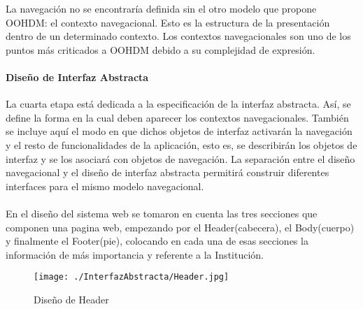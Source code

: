 {\large La navegación no se encontraría definida sin el otro modelo que propone OOHDM: el contexto navegacional. Esto es la estructura de la presentación dentro de un determinado contexto. Los contextos navegacionales son uno de los puntos más criticados a OOHDM debido a su complejidad de expresión.}\\

\paragraph{Diseño de Interfaz Abstracta}
{\large La cuarta etapa está dedicada a la especificación de la interfaz abstracta. Así, se define la forma en la cual deben aparecer los contextos navegacionales. También se incluye aquí el modo en que dichos objetos de interfaz activarán la navegación y el resto de funcionalidades de la aplicación, esto es, se describirán los objetos de interfaz y se los asociará con objetos de navegación. La separación entre el diseño navegacional y el diseño de interfaz abstracta permitirá construir diferentes interfaces para el mismo modelo navegacional.}\\
\vspace{1cm}\\
{\large En el diseño del sistema web se tomaron en cuenta las tres secciones que componen una pagina web, empezando por el Header(cabecera), el Body(cuerpo) y finalmente el Footer(pie), colocando en cada una de esas secciones la información de más importancia y referente a la Institución.}\\

\begin{figure}[H]
\centering
	\texttt{[image: ./InterfazAbstracta/Header.jpg]}
	\caption{Diseño de Header}	
\end{figure}

